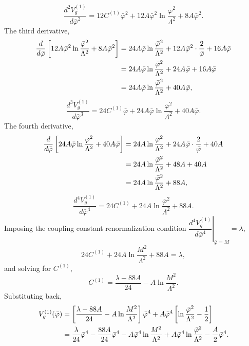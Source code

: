 \begin{equation}
	\frac{d^2V_g^{(1)}}{d\bar\varphi^2}
	= 12C^{(1)}\bar\varphi^2
	+ 12A\bar\varphi^2\ln\frac{\bar\varphi^2}{\Lambda^2}
	+ 8A\bar\varphi^2.
\end{equation}
The third derivative,
\begin{align}
	\frac{d}{d\bar\varphi}\left[12A\bar\varphi^2
		                      \ln\frac{\bar\varphi^2}{\Lambda^2}
		                      + 8A\bar\varphi^2\right]
	 & = 24A\bar\varphi\ln\frac{\bar\varphi^2}{\Lambda^2}
	+ 12A\bar\varphi^2\cdot\frac{2}{\bar\varphi}
	+ 16A\bar\varphi \notag                               \\
	 & = 24A\bar\varphi\ln\frac{\bar\varphi^2}{\Lambda^2}
	+ 24A\bar\varphi + 16A\bar\varphi \notag              \\
	 & = 24A\bar\varphi\ln\frac{\bar\varphi^2}{\Lambda^2}
	+ 40A\bar\varphi,
\end{align}
\begin{equation}
	\frac{d^3V_g^{(1)}}{d\bar\varphi^3}
	= 24C^{(1)}\bar\varphi
	+ 24A\bar\varphi\ln\frac{\bar\varphi^2}{\Lambda^2}
	+ 40A\bar\varphi.
\end{equation}
The fourth derivative,
\begin{align}
	\frac{d}{d\bar\varphi}\left[24A\bar\varphi
		                      \ln\frac{\bar\varphi^2}{\Lambda^2}
		                      + 40A\bar\varphi\right]
	 & = 24A\ln\frac{\bar\varphi^2}{\Lambda^2}
	+ 24A\bar\varphi\cdot\frac{2}{\bar\varphi}
	+ 40A \notag                                      \\
	 & = 24A\ln\frac{\bar\varphi^2}{\Lambda^2}
	+ 48A + 40A \notag                                \\
	 & = 24A\ln\frac{\bar\varphi^2}{\Lambda^2} + 88A,
\end{align}
\begin{equation}
	\frac{d^4V_g^{(1)}}{d\bar\varphi^4}
	= 24C^{(1)}
	+ 24A\ln\frac{\bar\varphi^2}{\Lambda^2} + 88A.
\end{equation}
Imposing the coupling constant renormalization condition
$\left.\dfrac{d^4V_g^{(1)}}{d\bar\varphi^4}\right|_{\bar\varphi=M}
	= \lambda$,
\begin{equation}
	24C^{(1)} + 24A\ln\frac{M^2}{\Lambda^2} + 88A = \lambda,
\end{equation}
and solving for $C^{(1)}$,
\begin{equation}
	C^{(1)} = \frac{\lambda - 88A}{24} - A\ln\frac{M^2}{\Lambda^2}.
\end{equation}
Substituting back,
\begin{align}
	V_g^{(1)}(\bar\varphi)
	 & = \left[\frac{\lambda - 88A}{24}
		     - A\ln\frac{M^2}{\Lambda^2}\right]\bar\varphi^4
	+ A\bar\varphi^4\left[\ln\frac{\bar\varphi^2}{\Lambda^2}
		                - \frac{1}{2}\right] \notag \\
	 & = \frac{\lambda}{24}\bar\varphi^4
	- \frac{88A}{24}\bar\varphi^4
	- A\bar\varphi^4\ln\frac{M^2}{\Lambda^2}
	+ A\bar\varphi^4\ln\frac{\bar\varphi^2}{\Lambda^2}
	- \frac{A}{2}\bar\varphi^4.
\end{align}
